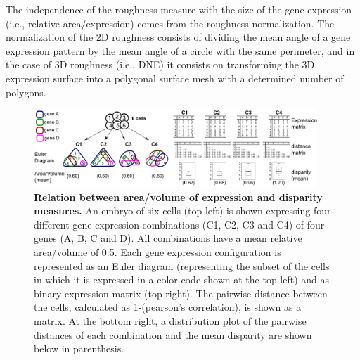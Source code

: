 The independence of the roughness measure with the size of the gene expression (i.e., relative area/expression) comes from the roughness normalization. The normalization of the 2D roughness consists of dividing the mean angle of a gene expression pattern by the mean angle of a circle with the same perimeter, and in the case of 3D roughness (i.e., DNE) it consists on transforming the 3D expression surface into a polygonal surface mesh with a determined number of polygons. 


\begin{figure}[h]
  \includegraphics[width=0.95\textwidth]{./Images/measures_relations.png}
  \centering
  \caption{\textbf{Relation between area/volume of expression and disparity measures.} An embryo of six cells (top left) is shown expressing four different gene expression combinations (C1, C2, C3 and C4) of four genes (A, B, C and D). All combinations have a mean relative area/volume of 0.5. Each gene expression configuration is represented as an Euler diagram (representing the subset of the cells in which it is expressed in a color code shown at the top left) and as binary expression matrix (top right). The pairwise distance between the cells, calculated as 1-(pearson's correlation), is shown as a matrix. At the bottom right, a distribution plot of the pairwise distances of each combination and the mean disparity are shown below in parenthesis.
 }
  \label{fig:measures_relations}
\end{figure}
